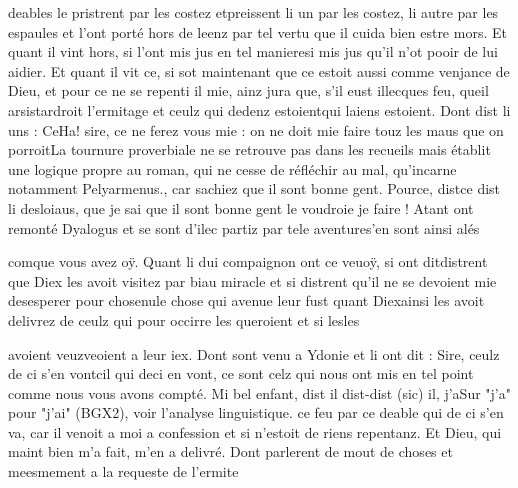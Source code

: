 \documentclass{article}
\begin{document}
\begin{pages}
                  deables le 
                  pristrent par les costez etpreissent li un par les costez, li autre par les espaules et l’ont porté 
                  hors de leenz par tel vertu que il cuida 
                  bien estre mors. Et quant il vint hors, si l’ont 
                  mis jus en tel manieresi mis jus qu’il n’ot pooir de lui aidier. Et quant il vit ce, si sot 
                  maintenant que ce estoit aussi comme venjance de Dieu, et pour ce ne se repenti il mie,
               ainz jura que, s’il eust illecques feu, 
                     queil 
                     arsistardroit
                  l’ermitage et ceulz qui
                  dedenz 
                     estoientqui laiens estoient. Dont dist li uns : 
                     CeHa! sire, ce ne ferez vous mie : on ne doit mie faire touz les maus
                     que on porroitLa tournure proverbiale ne se
                     retrouve pas dans les recueils mais établit une logique propre au roman, qui ne
                     cesse de réfléchir au mal, qu'incarne notamment Pelyarmenus., 
                     car sachiez 
                     que il sont bonne gent.
               Pource, 
                     distce dist
                  li desloiaus, que je sai que il sont bonne
                  gent le voudroie je faire ! Atant ont remonté Dyalogus et 
                  se sont d’ilec partiz par tele aventures'en sont ainsi alés
               
                  
                           comque vous avez oÿ. \pend
            \pstart 
               Quant li dui compaignon ont ce 
                  veuoÿ, si 
                  ont ditdistrent que Diex les avoit visitez par biau miracle et 
                  si distrent qu’il ne se devoient mie desesperer pour 
                  chosenule chose qui avenue leur fust quant 
                  Diexainsi les avoit delivrez de ceulz qui pour occirre les queroient et si 
                  lesles
               
                  avoient veuzveoient a leur iex. Dont sont venu a Ydonie et li
               ont dit : Sire, 
                     ceulz de ci s’en vontcil qui deci en vont, ce sont celz qui nous ont mis en tel point comme nous vous avons
                  compté.
               Mi bel enfant, 
                     dist il
                     dist-dist (sic) il, j'aSur "j'a" pour "j'ai" (BGX2), voir l'analyse
                     linguistique. ce feu par ce deable qui de ci s’en va, car il venoit a
                  moi a confession et si n’estoit de riens repentanz. Et Dieu, qui maint bien m’a
                  fait, m’en a delivré. Dont parlerent de
                  mout de choses et meesmement a la requeste de l’ermite
               

\end{pages}
\end{document}
